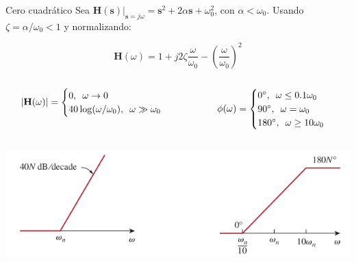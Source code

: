\documentclass[aspectratio=169, usenames,svgnames,dvipsnames]{beamer}
\newcommand{\laplace}[1]{\mathbf{#1}(\mathbf{s})}
\newcommand{\slp}{\mathbf{s}}
\newcommand{\fasor}[1]{\mathbf{#1}(\omega)}
\begin{document}
\begin{frame}[label={sec:org762d339}]{Cero cuadrático}
Sea \(\laplace{H}\rvert_{\slp = j\omega}  = \slp^2 + 2\alpha \slp + \omega_0^2\), con \(\alpha < \omega_0\). Usando \(\zeta = \alpha/\omega_0 < 1\) y normalizando:

\[
  \fasor{H} = 1 + j 2 \zeta \frac{\omega}{\omega_0} - \left(\frac{\omega}{\omega_0}\right)^2 
\]

\begin{columns}
\begin{column}{0.5\columnwidth}
\[
  |\fasor{H}| = 
  \begin{cases}
  0, \enskip \omega \to 0\\
  40 \log (\omega/\omega_0), \enskip \omega \gg \omega_0\\
  \end{cases}
\]
\end{column}

\begin{column}{0.5\columnwidth}
\[
  \phi(\omega) = 
  \begin{cases}
    \ang{0},\enskip \omega \leq 0.1\omega_0\\
    \ang{90}, \enskip \omega = \omega_0\\
    \ang{180}, \enskip \omega \geq 10 \omega_0
  \end{cases}
\]
\end{column}
\end{columns}

\begin{center}
\includegraphics[height=0.3\textheight]{../figs/BodeCeroCuadratico.pdf}
\end{center}
\end{frame}
\end{document}
